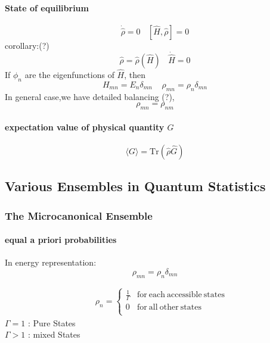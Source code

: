 \documentclass{article}
\begin{document}
\paragraph{State of equilibrium}
\begin{equation}
\dot{\widehat{\rho}}= 0 \ \ \ \ [\widehat{H},\widehat{\rho}] =0 
\end{equation}
corollary:(?)
\begin{equation}
\widehat{\rho}= \widehat{\rho}(\widehat{H})  \ \ \ \  \dot{\widehat{H}}=0 
\end{equation}
If $\phi_n$ are the eigenfunctions of $\widehat{H}$, then 
\begin{equation}
H_{mn}=E_n \delta_{mn} \ \ \ \ \  \rho_{mn} = \rho_{n} \delta_{mn}
\end{equation}
In general case,we have detailed balancing (?),
\begin{equation}
\rho_{mn} = \rho_{nm}
\end{equation}

\paragraph{expectation value of physical quantity $G$}
\begin{equation}
\langle G \rangle = \mathrm{Tr}(\widehat{\rho} \widehat{G})
\end{equation}

\subsection{Various Ensembles in Quantum Statistics}
\subsubsection{The Microcanonical Ensemble}
\paragraph{equal a priori probabilities}
In energy representation:
\begin{equation}
\rho_{mn}=\rho_n \delta_{mn}
\end{equation}

\begin{eqnarray}&&
 \rho_n =\left\{\begin{array}{cc}
 \frac{1}{\Gamma}          & \mathrm{for \  each \ accessible \ states}       \\
 0       &  \mathrm{for \  all \ other \ states}      \\
 \end{array} \right.
 \end {eqnarray}
$\Gamma=1$ : Pure States \\
$\Gamma>1$ : mixed States \\
\end{document}

